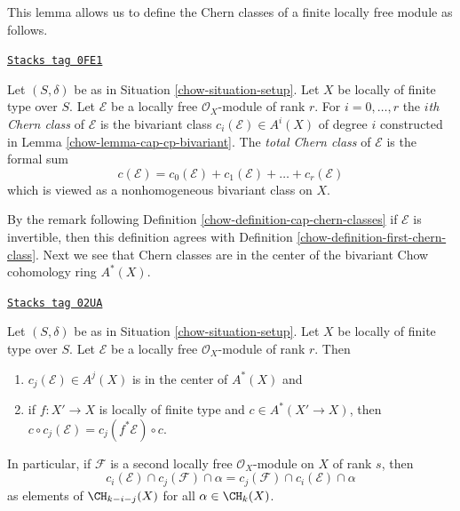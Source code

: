 This lemma allows us to define the Chern classes of a finite
locally free module as follows.

\begin{definition}
\label{chow-definition-chern-classes-final}
\href{https://stacks.math.columbia.edu/tag/0FE1}{\texttt{Stacks tag 0FE1}}

Let $(S, \delta)$ be as in Situation \ref{chow-situation-setup}.
Let $X$ be locally of finite type over $S$.
Let $\mathcal{E}$ be a locally free $\mathcal{O}_X$-module
of rank $r$. For $i = 0, \ldots, r$ the {\it $i$th Chern class}
of $\mathcal{E}$ is the bivariant class
$c_i(\mathcal{E}) \in A^i(X)$ of degree $i$
constructed in Lemma \ref{chow-lemma-cap-cp-bivariant}. The
{\it total Chern class} of $\mathcal{E}$ is the formal sum
$$
c(\mathcal{E}) =
c_0(\mathcal{E}) + c_1(\mathcal{E}) + \ldots + c_r(\mathcal{E})
$$
which is viewed as a nonhomogeneous bivariant class on $X$.
\end{definition}

By the remark following Definition \ref{chow-definition-cap-chern-classes}
if $\mathcal{E}$ is invertible, then this definition agrees with
Definition \ref{chow-definition-first-chern-class}.
Next we see that Chern classes are in the center of the bivariant
Chow cohomology ring $A^*(X)$.

\begin{lemma}
\label{chow-lemma-cap-commutative-chern}
\href{https://stacks.math.columbia.edu/tag/02UA}{\texttt{Stacks tag 02UA}}

Let $(S, \delta)$ be as in Situation \ref{chow-situation-setup}.
Let $X$ be locally of finite type over $S$.
Let $\mathcal{E}$ be a locally free $\mathcal{O}_X$-module of rank $r$.
Then
\begin{enumerate}
\item $c_j(\mathcal{E}) \in A^j(X)$ is in the center of $A^*(X)$ and
\item if $f : X' \to X$ is locally of finite type and $c \in A^*(X' \to X)$,
then $c \circ c_j(\mathcal{E}) = c_j(f^*\mathcal{E}) \circ c$.
\end{enumerate}
In particular, if $\mathcal{F}$ is a second locally free
$\mathcal{O}_X$-module on $X$ of rank $s$, then
$$
c_i(\mathcal{E}) \cap c_j(\mathcal{F}) \cap \alpha
=
c_j(\mathcal{F}) \cap c_i(\mathcal{E}) \cap \alpha
$$
as elements of $\CH_{k - i - j}(X)$ for all $\alpha \in \CH_k(X)$.
\end{lemma}

